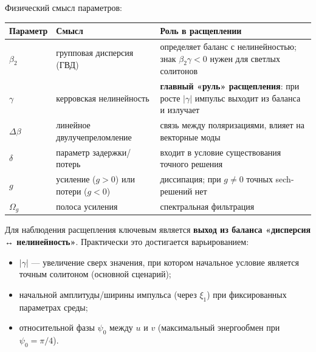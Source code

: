 \documentclass{article}
\begin{document}
Физический смысл параметров:

\begin{table}[h!]
    \centering
    \renewcommand{\arraystretch}{1.3} %
    \begin{tabularx}{\textwidth}{@{} >{\raggedright\arraybackslash}p{2.5cm} >{\raggedright\arraybackslash}X >{\raggedright\arraybackslash}X @{}}
        \toprule
        Параметр        & Смысл                                   & Роль в расщеплении                                                                                \\
        \midrule
        \(\beta_2\)     & групповая дисперсия (ГВД)               & определяет баланс с нелинейностью; знак \(\beta_2\gamma<0\) нужен для светлых солитонов           \\
        \(\gamma\)      & керровская нелинейность                 & \textbf{главный «руль» расщепления}: при росте \(|\gamma|\) импульс выходит из баланса и излучает \\
        \(\Delta\beta\) & линейное двулучепреломление             & связь между поляризациями, влияет на векторные моды                                               \\
        \(\delta\)      & параметр задержки/потерь                & входит в условие существования точного решения                                                    \\
        \(g\)           & усиление (\(g>0\)) или потери (\(g<0\)) & диссипация; при \(g\neq0\) точных sech-решений нет                                                \\
        \(\Omega_g\)    & полоса усиления                         & спектральная фильтрация                                                                           \\
        \bottomrule
    \end{tabularx}
\end{table}

Для наблюдения расщепления ключевым является \textbf{выход из баланса «дисперсия ↔ нелинейность»}. Практически это достигается варьированием:

\begin{itemize}
    \item \(|\gamma|\) --- увеличение сверх значения, при котором начальное условие является точным солитоном (основной сценарий);
    \item начальной амплитуды/ширины импульса (через \(\xi_1\)) при фиксированных параметрах среды;
    \item относительной фазы \(\psi_0\) между \(u\) и \(v\) (максимальный энергообмен при \(\psi_0=\pi/4\)).
\end{itemize}
\end{document}
